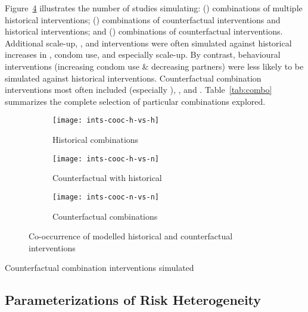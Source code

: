 Figure~\ref{fig:cooc} illustrates the number of studies simulating:
() combinations of multiple historical interventions;
() combinations of counterfactual interventions and historical interventions; and
() combinations of counterfactual interventions.
Additional \art scale-up, \vmmc, and \prep interventions were often simulated against
historical increases in \vmmc, condom use, and especially \art scale-up.
By contrast, behavioural interventions (increasing condom use \& decreasing partners)
were less likely to be simulated against historical interventions.
Counterfactual combination interventions most often included
\art (especially \utt), \vmmc, and \prep.
Table~\ref{tab:combo} summarizes the complete selection of particular combinations explored.
\begin{figure}
  \centering
  \begin{subfigure}{0.33\linewidth}
    \centering
    \texttt{[image: ints-cooc-h-vs-h]}
    \caption{Historical combinations}
    \label{fig:cooc-hh}
  \end{subfigure}%
  \begin{subfigure}{0.33\linewidth}
    \centering
    \texttt{[image: ints-cooc-h-vs-n]}
    \caption{Counterfactual with historical}
    \label{fig:cooc-hn}
  \end{subfigure}%
  \begin{subfigure}{0.33\linewidth} %
    \centering
    \texttt{[image: ints-cooc-n-vs-n]}
    \caption{Counterfactual combinations}
    \label{fig:cooc-nn}
  \end{subfigure}%
  \caption{Co-occurrence of modelled historical and counterfactual interventions}
  \label{fig:cooc}
\end{figure}
\begin{table}
  \centering
  \caption{Counterfactual combination interventions simulated}
  
  \label{tab:combo}
\end{table}
\subsection{Parameterizations of Risk Heterogeneity}
\label{ss:res:risk}
